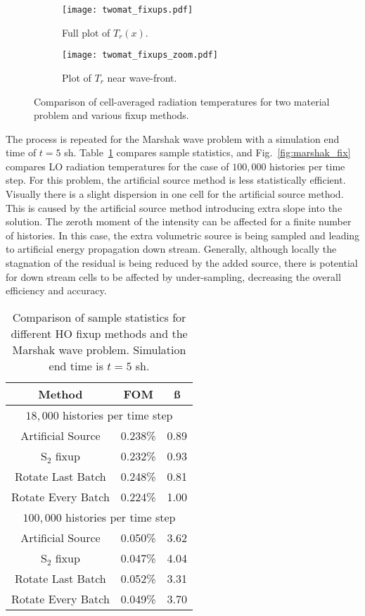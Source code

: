 \begin{figure}[h]
\begin{subfigure}{0.7\textwidth}
  \centering
    \texttt{[image: twomat\_fixups.pdf]}
    \caption{\label{fig:twomat_fix_full} Full plot of $T_r(x)$.}
\end{subfigure}
\begin{subfigure}{0.7\textwidth}
  \centering
  \texttt{[image: twomat\_fixups\_zoom.pdf]}
  \caption{\label{fig:twomat_fix_zoom} Plot of $T_r$ near wave-front.}
\end{subfigure}
    \centering
    \caption{\label{fig:twomat_fix}Comparison of cell-averaged radiation temperatures for
two material problem and various fixup methods.}
\end{figure}

The process is repeated for the Marshak wave problem with a simulation end time of $t=5$ sh. 
Table~\ref{tab:marshak_fix} compares sample statistics, and Fig.~\ref{fig:marshak_fix}
compares LO radiation temperatures for the case of $100,000$ histories per time step.
For this problem, the artificial source method is less statistically efficient. 
Visually there is a slight dispersion in one cell for the artificial source method.  This
is caused by the artificial source method introducing extra slope into the solution.
The zeroth moment of the intensity can be affected for a finite number of histories.  In
this case, the extra volumetric source is being sampled and leading to artificial energy
propagation down stream.  Generally, although locally the stagnation of the residual is
being reduced by the added source, there is potential for down stream cells to be affected
by under-sampling, decreasing the overall efficiency and accuracy.
\begin{table}
    \centering
    \begin{tabular}{|c|cc|} \hline
    Method & FOM  & \ss  \\ \hline \hline
    \multicolumn{3}{|c|}{$18,000$ histories per time step} \\ \hline
    Artificial Source  &  0.238\%  & 0.89 \\
    S$_2$ fixup        &  0.232\%  & 0.93  \\
    Rotate Last Batch  &  0.248\%  & 0.81   \\
    Rotate Every Batch &  0.224\%  & 1.00    \\ \hline
    \multicolumn{3}{|c|}{$100,000$ histories per time step} \\ \hline
Artificial Source      &  0.050\%  & 3.62 \\
S$_2$ fixup            &  0.047\%  & 4.04 \\
Rotate Last Batch      &  0.052\%  & 3.31 \\
Rotate Every Batch     &  0.049\%  & 3.70  \\ \hline
    \end{tabular}
    \caption{\label{tab:marshak_fix}Comparison of sample statistics for different HO fixup
methods and the Marshak wave problem. Simulation end time is $t=5$ sh.}
\end{table}

